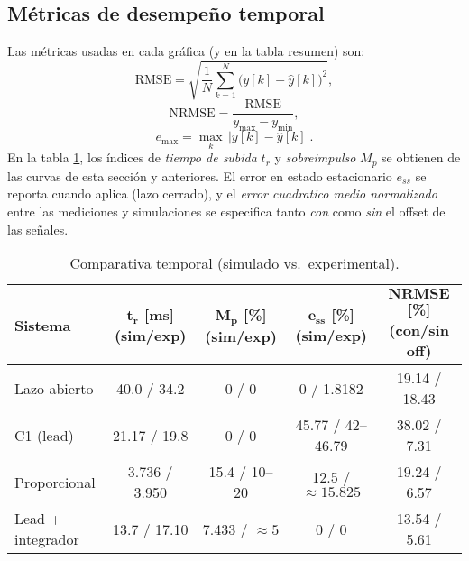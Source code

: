\subsection{Métricas de desempeño temporal}
Las métricas usadas en cada gráfica (y en la tabla resumen) son:
\begin{equation}
	\label{eq:rmse_temporal}
	\mathrm{RMSE}=\sqrt{\frac{1}{N}\sum_{k=1}^{N}\big(y[k]-\hat{y}[k]\big)^2},
\end{equation}
\begin{equation}
	\label{eq:rmse_porct}
	\mathrm{NRMSE}=\frac{\mathrm{RMSE}}{y_{\max}-y_{\min}},
\end{equation}
\begin{equation}
	\label{eq:emax_temporal}
	e_{\max}=\max_k\,\lvert y[k]-\hat{y}[k]\rvert.
\end{equation}
\balance
En la tabla \ref{tab:comparativa_temporal_min}, los índices de \emph{tiempo de subida} \(t_r\) y \emph{sobreimpulso} \(M_p\) se obtienen de las curvas de esta sección y anteriores. El error en estado estacionario \(e_{ss}\) se reporta cuando aplica (lazo cerrado), y el \emph{error cuadratico medio normalizado} entre las mediciones y simulaciones se especifica tanto \emph{con} como \emph{sin} el offset de las señales.

\begin{table}[t]
	\centering
	\caption{Comparativa temporal (simulado vs.\ experimental).}
	\label{tab:comparativa_temporal_min}
	\small
	\setlength{\tabcolsep}{4pt}
	\renewcommand{\arraystretch}{1.1}
	\begin{adjustbox}{max width=\columnwidth}
		\begin{tabular}{lcccc}
			\toprule
			\textbf{Sistema} &
			\makecell{\(\mathbf{t_r}\) [ms]\\(sim/exp)} &
			\makecell{\(\mathbf{M_p}\) [\%]\\(sim/exp)} &
			\makecell{\(\mathbf{e_{ss}}\) [\%]\\(sim/exp)} &
			\makecell{\(\mathbf{NRMSE}\) [\%]\\(con/sin off)}\\
			\midrule
			Lazo abierto       & 40.0 / 34.2   & 0 / 0                 & 0 / 1.8182             & 19.14 / 18.43 \\
			C1 (lead)          & 21.17 / 19.8  & 0 / 0                 & 45.77 / 42--46.79      & 38.02 / 7.31 \\
			Proporcional       & 3.736 / 3.950 & 15.4 / 10--20         & 12.5 / \(\approx 15.825\) & 19.24 / 6.57 \\
			Lead + integrador  & 13.7 / 17.10  & 7.433 / \(\approx 5\) & 0 / 0                  & 13.54 / 5.61 \\
			\bottomrule
		\end{tabular}
	\end{adjustbox}
\end{table}

